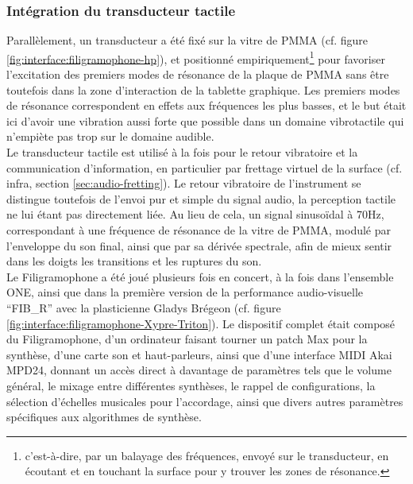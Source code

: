 \subsubsection{Intégration du transducteur tactile}

\noindent Parallèlement, un transducteur a été fixé sur la vitre de \gls{PMMA} (cf. figure \ref{fig:interface:filigramophone-hp}), et positionné empiriquement\footnote{c'est-à-dire, par un balayage des fréquences, envoyé sur le transducteur, en écoutant et en touchant la surface pour y trouver les zones de résonance.} pour favoriser l'excitation des premiers modes de résonance de la plaque de \gls{PMMA} sans être toutefois dans la zone d'interaction de la tablette graphique. Les premiers modes de résonance correspondent en effets aux fréquences les plus basses, et le but était ici d'avoir une vibration aussi forte que possible dans un domaine vibrotactile qui n'empiète pas trop sur le domaine audible.\\
\indent Le transducteur tactile est utilisé à la fois pour le retour vibratoire et la communication d'information, en particulier par frettage virtuel de la surface (cf. infra, section \ref{sec:audio-fretting}). Le retour vibratoire de l'instrument se distingue toutefois de l'envoi pur et simple du signal audio, la perception tactile ne lui étant pas directement liée. Au lieu de cela, un signal sinusoïdal à 70Hz, correspondant à une fréquence de résonance de la vitre de \gls{PMMA}, modulé par l'enveloppe du son final, ainsi que par sa dérivée spectrale, afin de mieux sentir dans les doigts les transitions et les ruptures du son.\\
\indent Le Filigramophone a été joué plusieurs fois en concert, à la fois dans l'ensemble ONE, ainsi que dans la première version de la performance audio-visuelle ``FIB\_R'' avec la plasticienne Gladys Brégeon (cf. figure \ref{fig:interface:filigramophone-Xypre-Triton}). Le dispositif complet était composé du Filigramophone, d'un ordinateur faisant tourner un patch Max pour la synthèse, d'une carte son et haut-parleurs, ainsi que d'une interface \gls{MIDI} Akai MPD24, donnant un accès direct à davantage de paramètres tels que le volume général, le mixage entre différentes synthèses, le rappel de configurations, la sélection d'échelles musicales pour l'accordage, ainsi que divers autres paramètres spécifiques aux algorithmes de synthèse.

